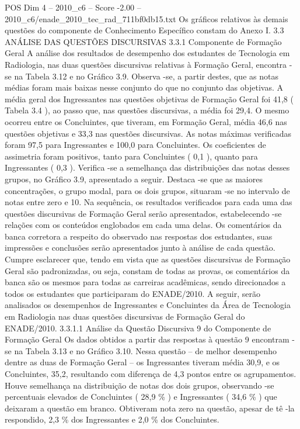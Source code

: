 \begin{textsample}{POS Dim 4 – 2010\_c6 – Score -2.00 – 2010\_c6/enade\_2010\_tec\_rad\_711bf0db15.txt}
Os gráficos relativos às demais questões do componente de Conhecimento Específico constam do Anexo I. 3.3 ANÁLISE DAS QUESTÕES DISCURSIVAS 3.3.1 Componente de Formação Geral A análise dos resultados de desempenho dos estudantes de Tecnologia em Radiologia, nas duas questões discursivas relativas à Formação Geral, encontra -se na Tabela 3.12 e no Gráfico 3.9.
Observa -se, a partir destes, que as notas médias foram mais baixas nesse conjunto do que no conjunto das objetivas.
A média geral dos Ingressantes nas questões objetivas de Formação Geral foi 41,8 ( Tabela 3.4 ), ao passo que, nas questões discursivas, a média foi 29,4.
O mesmo ocorreu entre os Concluintes, que tiveram, em Formação Geral, média 46,6 nas questões objetivas e 33,3 nas questões discursivas.
As notas máximas verificadas foram 97,5 para Ingressantes e 100,0 para Concluintes.
Os coeficientes de assimetria foram positivos, tanto para Concluintes ( 0,1 ), quanto para Ingressantes ( 0,3 ).
Verifica -se a semelhança das distribuições das notas desses grupos, no Gráfico 3.9, apresentado a seguir.
Destaca -se que as maiores concentrações, o grupo modal, para os dois grupos, situaram -se no intervalo de notas entre zero e 10.
Na sequência, os resultados verificados para cada uma das questões discursivas de Formação Geral serão apresentados, estabelecendo -se relações com os conteúdos englobados em cada uma delas.
Os comentários da banca corretora a respeito do observado nas respostas dos estudantes, suas impressões e conclusões serão apresentados junto à análise de cada questão.
Cumpre esclarecer que, tendo em vista que as questões discursivas de Formação Geral são padronizadas, ou seja, constam de todas as provas, os comentários da banca são os mesmos para todas as carreiras acadêmicas, sendo direcionados a todos os estudantes que participaram do ENADE/2010.
A seguir, serão analisados os desempenhos de Ingressantes e Concluintes da Área de Tecnologia em Radiologia nas duas questões discursivas de Formação Geral do ENADE/2010. 3.3.1.1 Análise da Questão Discursiva 9 do Componente de Formação Geral Os dados obtidos a partir das respostas à questão 9 encontram -se na Tabela 3.13 e no Gráfico 3.10.
Nessa questão – de melhor desempenho dentre as duas de Formação Geral – os Ingressantes tiveram média 30,9, e os Concluintes, 35,2, resultando com diferença de 4,3 pontos entre os agrupamentos.
Houve semelhança na distribuição de notas dos dois grupos, observando -se percentuais elevados de Concluintes ( 28,9 \% ) e Ingressantes ( 34,6 \% ) que deixaram a questão em branco.
Obtiveram nota zero na questão, apesar de tê -la respondido, 2,3 \% dos Ingressantes e 2,0 \% dos Concluintes.

\end{textsample}
